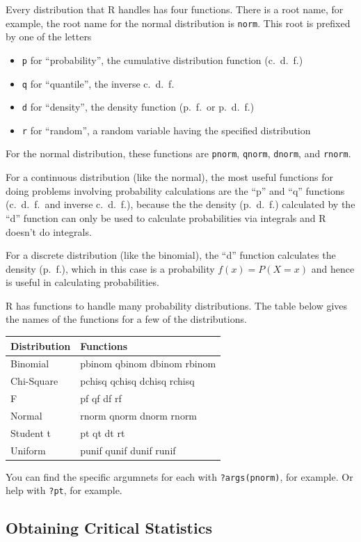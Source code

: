 \documentclass[]{book}
\providecommand{\tightlist}{%
  \setlength{\itemsep}{0pt}\setlength{\parskip}{0pt}}
\begin{document}
Every distribution that R handles has four functions. There is a root name, for example, the root name for the normal distribution is \texttt{norm}. This root is prefixed by one of the letters

\begin{itemize}
\tightlist
\item
  \texttt{p} for ``probability'', the cumulative distribution function (c.~d.~f.)
\item
  \texttt{q} for ``quantile'', the inverse c.~d.~f.
\item
  \texttt{d} for ``density'', the density function (p.~f.~or p.~d.~f.)
\item
  \texttt{r} for ``random'', a random variable having the specified distribution
\end{itemize}

For the normal distribution, these functions are \texttt{pnorm}, \texttt{qnorm}, \texttt{dnorm}, and \texttt{rnorm}.

For a continuous distribution (like the normal), the most useful functions for doing problems involving probability calculations are the ``p'' and ``q'' functions (c.~d.~f.~and inverse c.~d.~f.), because the the density (p.~d.~f.) calculated by the ``d'' function can only be used to calculate probabilities via integrals and R doesn't do integrals.

For a discrete distribution (like the binomial), the ``d'' function calculates the density (p.~f.), which in this case is a probability \(f(x) = P(X = x)\) and hence is useful in calculating probabilities.

R has functions to handle many probability distributions. The table below gives the names of the functions for a few of the distributions.

\begin{longtable}[]{@{}ll@{}}
\toprule
Distribution & Functions\tabularnewline
\midrule
\endhead
Binomial & pbinom qbinom dbinom rbinom\tabularnewline
Chi-Square & pchisq qchisq dchisq rchisq\tabularnewline
F & pf qf df rf\tabularnewline
Normal & rnorm qnorm dnorm rnorm\tabularnewline
Student t & pt qt dt rt\tabularnewline
Uniform & punif qunif dunif runif\tabularnewline
\bottomrule
\end{longtable}

You can find the specific argumnets for each with \texttt{?args(pnorm)}, for example. Or help with \texttt{?pt}, for example.

\hypertarget{obtaining-critical-statistics}{%
\subsection{Obtaining Critical Statistics}\label{obtaining-critical-statistics}}
\end{document}

